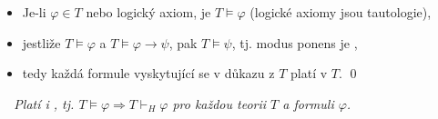     {\it {}}
    \begin{itemize}
    \item Je-li $\varphi\in T$ nebo logický axiom, je $T \models \varphi$ (logické axiomy jsou tautologie),
    \item jestliže $T \models \varphi$ a $T \models \varphi \to \psi$, pak $T \models \psi$, tj. modus ponens je ,
    \item tedy každá formule vyskytující se v důkazu z $T$ platí v $T$. \qed
\end{itemize}
    \medskip
    
    {\it {}\ \ Platí i , tj. $T\models \varphi \Rightarrow T\vdash_H \varphi$ pro každou teorii $T$ a formuli $\varphi$.}



